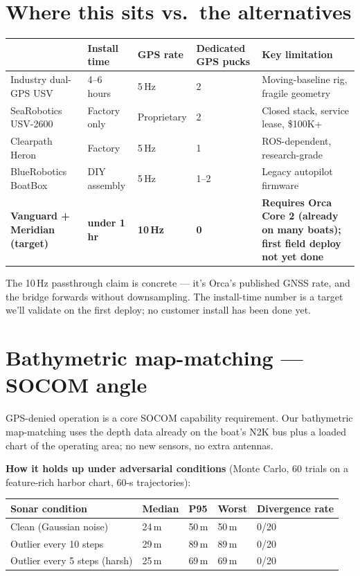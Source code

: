 \documentclass[10pt,a4paper]{article}
\begin{document}
\section{Where this sits vs.\ the alternatives}

\begin{tabularx}{\textwidth}{@{}L{38mm} l l l X@{}}
\toprule
\textbf{} & \textbf{Install time} & \textbf{GPS rate} & \textbf{Dedicated GPS pucks} & \textbf{Key limitation} \\
\midrule
{} Industry dual-GPS USV & 4--6 hours & 5\,Hz & 2 & Moving-baseline rig, fragile geometry \\
SeaRobotics USV-2600 & Factory only & Proprietary & 2 & Closed stack, service lease, \$100K+ \\
 Clearpath Heron & Factory & 5\,Hz & 1 & ROS-dependent, research-grade \\
BlueRobotics BoatBox & DIY assembly & 5\,Hz & 1--2 & Legacy autopilot firmware \\
\textbf{Vanguard + Meridian (target)} & \textbf{under 1\,hr} & \textbf{10\,Hz} & \textbf{0} & \textbf{Requires Orca Core 2 (already on many boats); first field deploy not yet done} \\
\bottomrule
\end{tabularx}

The 10\,Hz passthrough claim is concrete — it's Orca's published GNSS rate,
and the bridge forwards without downsampling. The install-time number is a
target we'll validate on the first deploy; no customer install has been
done yet.

\section{Bathymetric map-matching — SOCOM angle}
GPS-denied operation is a core SOCOM capability requirement. Our
bathymetric map-matching uses the depth data already on the boat's N2K
bus plus a loaded chart of the operating area; no new sensors, no
extra antennas.

\textbf{How it holds up under adversarial conditions} (Monte Carlo,
60 trials on a feature-rich harbor chart, 60-s trajectories):

\begin{tabularx}{\textwidth}{@{}l l l l X@{}}
\toprule
\textbf{Sonar condition} & \textbf{Median} & \textbf{P95} & \textbf{Worst} & \textbf{Divergence rate} \\
\midrule
\rowcolor{mRow} Clean (Gaussian noise) & 24\,m & 50\,m & 50\,m & 0/20 \\
Outlier every 10 steps & 29\,m & 89\,m & 89\,m & 0/20 \\
\rowcolor{mRow} Outlier every 5 steps (harsh) & 25\,m & 69\,m & 69\,m & 0/20 \\
\bottomrule
\end{tabularx}
\end{document}
